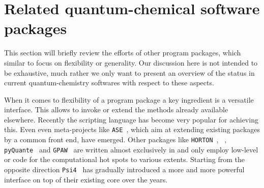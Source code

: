 \section{Related quantum-chemical software packages}
\newcommand{\psifour}{\texttt{Psi4}\xspace}
\newcommand{\pyquante}{\texttt{pyQuante}\xspace}
\newcommand{\horton}{\texttt{HORTON}\xspace}
\newcommand{\gpaw}{\texttt{GPAW}\xspace}
\newcommand{\ASE}{\texttt{ASE}\xspace}
\newcommand{\CPtK}{\texttt{CP2K}\xspace}

\label{sec:related}
%

This section will briefly review the efforts of other program packages,
which similar to \molsturm focus on flexibility or generality.
Our discussion here is not intended to be exhaustive,
much rather we only want to present an overview of the status
in current quantum-chemistry softwares with respect to these aspects.

When it comes to flexibility of a program package
a key ingredient is a versatile interface.
This allows to invoke or extend the methods already available elsewhere.
Recently the scripting language \python has become very popular
for achieving this.
Even even meta-projects like \ASE~\cite{Larsen2017},
which aim at extending existing packages by a common \python front end,
have emerged.
Other packages like \horton~\cite{Verstraelen2017}, \pyscf~\cite{Sun2017},
\pyquante~\cite{PyQuante} and \gpaw~\cite{Mortensen2005,Enkovaara2010} are written
almost exclusively in \python and only employ low-level \ccc or \cpp
code for the computational hot spots to various extents.
Starting from the opposite direction \psifour~\cite{Parrish2017} has
gradually introduced a more and more powerful \python interface on top of
their existing \cpp core over the years.

